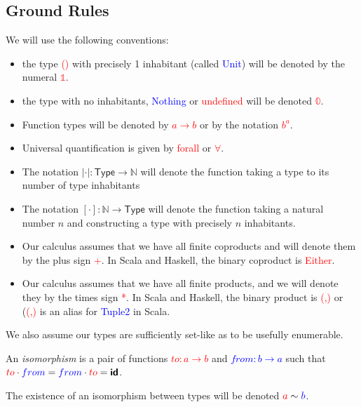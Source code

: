 \documentclass[tikz]{beamer}
\newcommand{\cat}[1]{\bm{ \mathsf{#1} }}
\newcommand{\zero}{\bm{\mathbb{0}}}
\newcommand{\one}{\bm{\mathbb{1}}}
\newcommand{\red}[1]{\textcolor{red}{#1}}
\newcommand{\mred}[1]{\textcolor{red}{$#1$}}
\newcommand{\blue}[1]{\textcolor{blue}{#1}}
\newcommand{\mblue}[1]{\textcolor{blue}{$#1$}}
\theoremstyle{definition}
\begin{document}
\subsection{Ground Rules}


\frame
{ 
	We will use the following conventions: 
	
	\begin{itemize}
		\item the type \red{()} with precisely 1 inhabitant (called \blue{Unit}) will be denoted by the numeral  \mred{\one}. 
		\item the type with no inhabitants, \blue{Nothing} or \red{undefined} will be denoted \mred{\zero}. 
		\item Function types will be denoted by \red{$a \to b$} or by the notation \red{$b^a$}. 
		\item Universal quantification is given by \red{forall} or \red{$\forall$}.
		\item The notation $|\cdot| : \cat{Type} \to \mathbb{N}$ will denote the function taking a type to its number of type inhabitants
		\item The notation $[\cdot] : \mathbb{N} \to \cat{Type} $ will denote the function taking a natural number $n$ and constructing a type with precisely $n$ inhabitants. 
	\end{itemize}
}

\frame
{
	\begin{itemize}
		\item Our calculus assumes that we have all finite coproducts and will denote them by the plus sign \red{+}. In Scala and Haskell, the binary coproduct is \red{Either}.
		\item Our calculus assumes that we have all finite products, and we will denote they by the times sign \red{*}. In Scala and Haskell, the binary product is \red{(,)} or (\red{(,)} is an alias for \blue{Tuple2} in Scala.
	\end{itemize}
}


\frame
{
	We also assume our types are sufficiently set-like as to be usefully enumerable. 
}

\frame
{
	
	\begin{definition}[Isomorphism]
	
		An \textit{isomorphism} is a pair of functions \mred{to : a \to b} and \mblue{from : b \to a} such that $\red{to} \cdot \blue{from} = \blue{from} \cdot \red{to} = \cat{id}$. 
		
		The existence of an isomorphism between types will be denoted $\red{a}  \sim \blue{b}$. 
		
	\end{definition}
}
\end{document}
